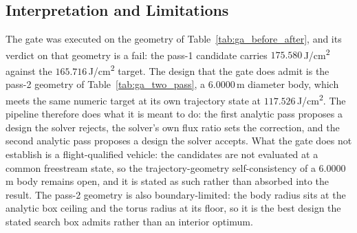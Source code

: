 \subsection{Interpretation and Limitations}
The gate was executed on the geometry of Table~\ref{tab:ga_before_after}, and its verdict on that geometry is a fail: the pass-1 candidate carries $175.580$\,J/cm\textsuperscript{{2}} against the $165.716$\,J/cm\textsuperscript{{2}} target. The design that the gate does admit is the pass-2 geometry of Table~\ref{tab:ga_two_pass}, a $6.0000$\,m diameter body, which meets the same numeric target at its own trajectory state at $117.526$\,J/cm\textsuperscript{{2}}. The pipeline therefore does what it is meant to do: the first analytic pass proposes a design the solver rejects, the solver's own flux ratio sets the correction, and the second analytic pass proposes a design the solver accepts. What the gate does not establish is a flight-qualified vehicle: the candidates are not evaluated at a common freestream state, so the trajectory-geometry self-consistency of a $6.0000$\,m body remains open, and it is stated as such rather than absorbed into the result. The pass-2 geometry is also boundary-limited: the body radius sits at the analytic box ceiling and the torus radius at its floor, so it is the best design the stated search box admits rather than an interior optimum.